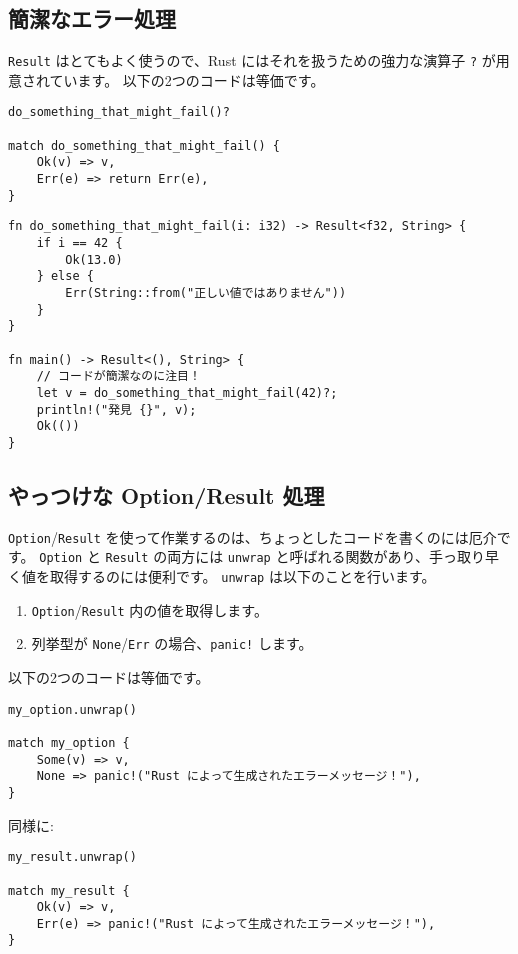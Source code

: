 \subsection{簡潔なエラー処理}

\texttt{Result} はとてもよく使うので、Rust
にはそれを扱うための強力な演算子 \texttt{?} が用意されています。
以下の2つのコードは等価です。

\begin{verbatim}
do_something_that_might_fail()?

match do_something_that_might_fail() {
    Ok(v) => v,
    Err(e) => return Err(e),
}
\end{verbatim}

\begin{verbatim}
fn do_something_that_might_fail(i: i32) -> Result<f32, String> {
    if i == 42 {
        Ok(13.0)
    } else {
        Err(String::from("正しい値ではありません"))
    }
}

fn main() -> Result<(), String> {
    // コードが簡潔なのに注目！
    let v = do_something_that_might_fail(42)?;
    println!("発見 {}", v);
    Ok(())
}
\end{verbatim}

\subsection{やっつけな Option/Result 処理}

\texttt{Option}/\texttt{Result}
を使って作業するのは、ちょっとしたコードを書くのには厄介です。
\texttt{Option} と \texttt{Result} の両方には \texttt{unwrap}
と呼ばれる関数があり、手っ取り早く値を取得するのには便利です。
\texttt{unwrap} は以下のことを行います。

\begin{enumerate}
\item
  \texttt{Option}/\texttt{Result} 内の値を取得します。
\item
  列挙型が \texttt{None}/\texttt{Err} の場合、\texttt{panic!} します。
\end{enumerate}

以下の2つのコードは等価です。

\begin{verbatim}
my_option.unwrap()

match my_option {
    Some(v) => v,
    None => panic!("Rust によって生成されたエラーメッセージ！"),
}
\end{verbatim}

同様に:

\begin{verbatim}
my_result.unwrap()

match my_result {
    Ok(v) => v,
    Err(e) => panic!("Rust によって生成されたエラーメッセージ！"),
}
\end{verbatim}

